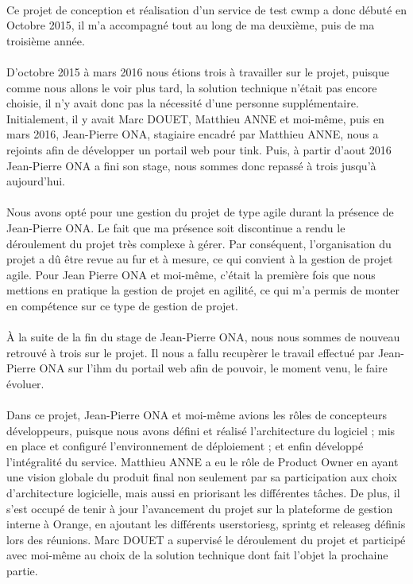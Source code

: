 \documentclass[12pt,a4paper]{report}
\begin{document}
\paragraph*{}Ce projet de conception et réalisation d’un service de test \gls{cwmp} a donc débuté en Octobre 2015, il m'a accompagné tout au long de ma deuxième, puis de ma troisième année.
\paragraph*{}D'octobre 2015 à mars 2016 nous étions trois à travailler sur le projet,  puisque comme nous allons le voir plus tard, la solution technique n’était pas encore choisie, il n’y avait donc pas la nécessité d’une personne supplémentaire. Initialement, il y avait Marc DOUET, Matthieu ANNE et moi-même, puis en mars 2016, Jean-Pierre ONA, stagiaire encadré par Matthieu ANNE, nous a rejoints afin de développer un portail web pour \gls{tink}. Puis, à partir d'aout 2016 Jean-Pierre ONA a fini son stage, nous sommes donc repassé à trois jusqu'à aujourd'hui.
\paragraph*{}Nous avons opté pour une gestion du projet de type agile durant la présence de Jean-Pierre ONA. Le fait que ma présence soit discontinue a rendu le déroulement du projet très complexe à gérer. Par conséquent, l’organisation du projet a dû être revue au fur et à mesure, ce qui convient à la gestion de projet agile. Pour Jean Pierre ONA et moi-même, c’était la première fois que nous mettions en pratique la gestion de projet en agilité, ce qui m’a permis de monter en compétence sur ce type de gestion de projet. 
\paragraph*{}À la suite de la fin du stage de Jean-Pierre ONA, nous nous sommes de nouveau retrouvé à trois sur le projet. Il nous a fallu recupèrer le travail effectué par Jean-Pierre ONA sur l'\gls{ihm} du portail web afin de pouvoir, le moment venu, le faire évoluer.
\paragraph*{}Dans ce projet, Jean-Pierre ONA et moi-même avions les rôles de concepteurs développeurs, puisque nous avons défini et réalisé l’architecture du logiciel ; mis en place et configuré l’environnement de déploiement ; et enfin développé l’intégralité du service. Matthieu ANNE a eu le rôle de Product Owner en ayant une vision globale du produit final non seulement par sa participation aux choix d’architecture logicielle, mais aussi en priorisant les différentes tâches. De plus, il s’est occupé de tenir à jour l’avancement du projet sur la plateforme de gestion interne à Orange, en ajoutant les différents \gls{userstoriesg}, \gls{sprintg} et \gls{releaseg} définis lors des réunions. Marc DOUET a supervisé le déroulement du projet et participé avec moi-même au choix de la solution technique dont fait l’objet la prochaine partie. \\
\end{document}
